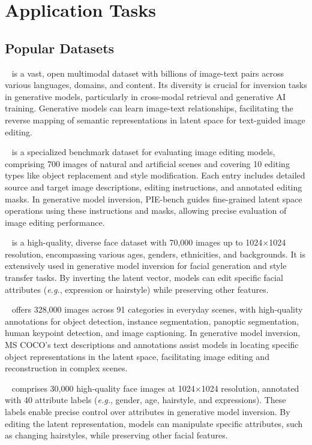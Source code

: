 \section{Application Tasks} \label{sec:experiment}
\subsection{Popular Datasets}
~\cite{LAION}
is a vast, open multimodal dataset with billions of image-text pairs across various languages, domains, and content. Its diversity is crucial for inversion tasks in generative models, particularly in cross-modal retrieval and generative AI training. Generative models can learn image-text relationships, facilitating the reverse mapping of semantic representations in latent space for text-guided image editing.

~\cite{TurboEdit}
is a specialized benchmark dataset for evaluating image editing models, comprising 700 images of natural and artificial scenes and covering 10 editing types like object replacement and style modification. Each entry includes detailed source and target image descriptions, editing instructions, and annotated editing masks. In generative model inversion, PIE-bench guides fine-grained latent space operations using these instructions and masks, allowing precise evaluation of image editing performance.

~\cite{StyleGAN}
is a high-quality, diverse face dataset with 70,000 images up to 1024$\times$1024 resolution, encompassing various ages, genders, ethnicities, and backgrounds. It is extensively used in generative model inversion for facial generation and style transfer tasks. By inverting the latent vector, models can edit specific facial attributes (\textit{e.g.}, expression or hairstyle) while preserving other features.

~\cite{MSCOCO}
offers 328,000 images across 91 categories in everyday scenes, with high-quality annotations for object detection, instance segmentation, panoptic segmentation, human keypoint detection, and image captioning. In generative model inversion, MS COCO's text descriptions and annotations assist models in locating specific object representations in the latent space, facilitating image editing and reconstruction in complex scenes.

~\cite{CelebA-HQ}
comprises 30,000 high-quality face images at 1024$\times$1024 resolution, annotated with 40 attribute labels (\textit{e.g.}, gender, age, hairstyle, and expressions). These labels enable precise control over attributes in generative model inversion. By editing the latent representation, models can manipulate specific attributes, such as changing hairstyles, while preserving other facial features.

